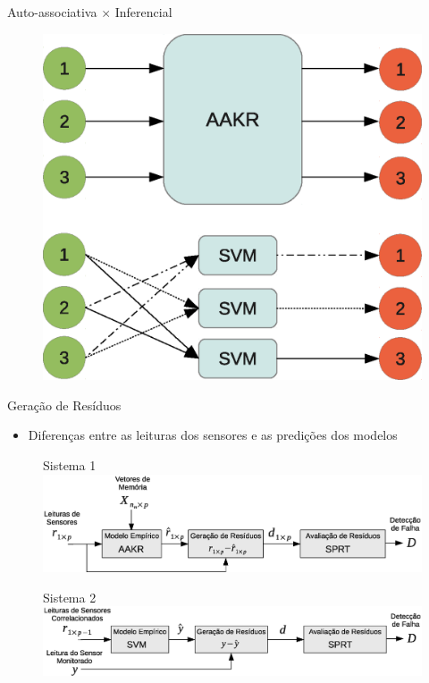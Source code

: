 \documentclass{beamer}
\begin{document}
\begin{frame}{Auto-associativa $\times$ Inferencial}
    \begin{figure}[!htb]
        \centering
        \includegraphics[height=.8\textheight]{figuras/autoassociativo_inferencial.eps}
    \end{figure}
    
\end{frame}

\begin{frame}{Geração de Resíduos}

    \begin{itemize}
        \item Diferenças entre as leituras dos sensores e as predições dos modelos
    \end{itemize}
    
    \begin{figure}[!htb]
        \centering Sistema 1
        \includegraphics[width=.8\textwidth]{figuras/aakr_sprt.eps}
    \end{figure}
    
    \begin{figure}[!htb]
        \centering Sistema 2
        \includegraphics[width=.8\textwidth]{figuras/svm_sprt.eps}
    \end{figure}
\end{frame}
\end{document}
